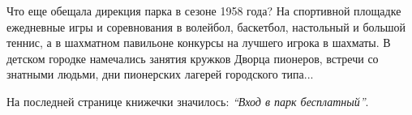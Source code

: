 Что еще обещала дирекция парка в сезоне 1958 года? На спортивной площадке
ежедневные игры и соревнования в волейбол, баскетбол, настольный и большой
теннис, а в шахматном павильоне конкурсы на лучшего игрока в шахматы. В детском
городке намечались занятия кружков Дворца пионеров, встречи со знатными людьми,
дни пионерских лагерей городского типа...

На последней странице книжечки значилось: \emph{\enquote{Вход в парк бесплатный}}.
